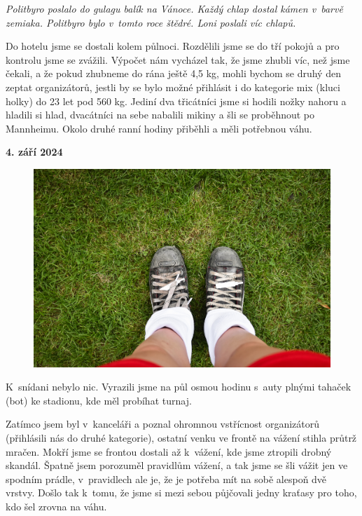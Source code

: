 \documentclass[11pt]{article}
\begin{document}
\begin{center}
  \textit{Politbyro poslalo do gulagu balík na Vánoce. Každý chlap dostal kámen v~barvě zemiaka. Politbyro bylo v~tomto roce štědré. Loni poslali víc chlapů.}
\end{center}

Do hotelu jsme se dostali kolem půlnoci. Rozdělili jsme se do tří pokojů a pro kontrolu jsme se zvážili.
Výpočet nám vycházel tak, že jsme zhubli víc, než jsme čekali, a že pokud zhubneme do rána ještě 4,5 kg, mohli bychom se druhý den zeptat organizátorů, jestli by se bylo možné přihlásit i do kategorie mix (kluci holky) do 23 let pod 560 kg. Jediní dva třicátníci jsme si hodili nožky nahoru a hladili si hlad, dvacátníci na sebe nabalili mikiny a šli se proběhnout po Mannheimu. Okolo druhé ranní hodiny přiběhli a měli potřebnou váhu.

\noindent\textbf{4. září 2024}
\vspace*{6pt}

\begin{figure}
  \vspace*{-\intextsep}
  \includegraphics[width=0.9\linewidth]{./lano-boty.jpg}
\end{figure}

\noindent
K~snídani nebylo nic. Vyrazili jsme na půl osmou hodinu s~auty plnými tahaček (bot) ke stadionu, kde měl probíhat turnaj.

Zatímco jsem byl v~kanceláři a poznal ohromnou vstřícnost organizátorů (přihlásili nás do druhé kategorie), ostatní venku ve frontě na vážení stihla průtrž mračen. Mokří jsme se frontou dostali až k~vážení, kde jsme ztropili drobný skandál. Špatně jsem porozuměl pravidlům vážení, a tak jsme se šli vážit jen ve spodním prádle, v~pravidlech ale je, že je potřeba mít na sobě alespoň dvě vrstvy. Došlo tak k~tomu, že jsme si mezi sebou půjčovali jedny kraťasy pro toho, kdo šel zrovna na váhu.
\end{document}
